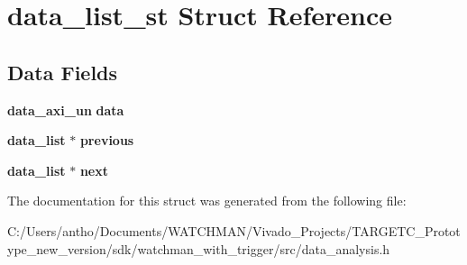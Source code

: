 \section{data\+\_\+list\+\_\+st Struct Reference}
\label{structdata__list__st}
\subsection*{Data Fields}
\begin{DoxyCompactItemize}
\item 
\mbox{\label{structdata__list__st_a3bec3a8b685ca74b96218b5826f55fc6}} 
\textbf{ data\+\_\+axi\+\_\+un} {\bfseries data}
\item 
\mbox{\label{structdata__list__st_a23f1012db1e6eb88a69e28cf0b419422}} 
\textbf{ data\+\_\+list} $\ast$ {\bfseries previous}
\item 
\mbox{\label{structdata__list__st_aeae23435d8356eb827211e1514b9cec3}} 
\textbf{ data\+\_\+list} $\ast$ {\bfseries next}
\end{DoxyCompactItemize}


The documentation for this struct was generated from the following file\+:\begin{DoxyCompactItemize}
\item 
C\+:/\+Users/antho/\+Documents/\+W\+A\+T\+C\+H\+M\+A\+N/\+Vivado\+\_\+\+Projects/\+T\+A\+R\+G\+E\+T\+C\+\_\+\+Prototype\+\_\+new\+\_\+version/sdk/watchman\+\_\+with\+\_\+trigger/src/data\+\_\+analysis.\+h\end{DoxyCompactItemize}
